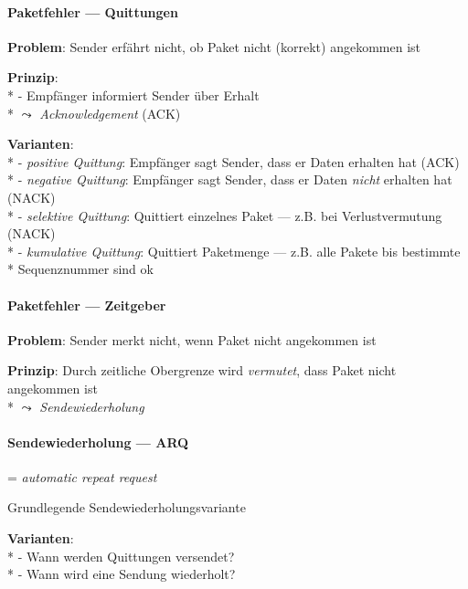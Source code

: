 \paragraph{Paketfehler --- Quittungen}
\begin{items}
  \item \textbf{Problem}: Sender erfährt nicht, ob Paket nicht (korrekt) angekommen ist
  \item \textbf{Prinzip}: \\*
    - Empfänger informiert Sender über Erhalt \\*
      \phantom{-} \( \leadsto \) \emph{Acknowledgement} (ACK)
  \item \textbf{Varianten}: \\*
    - \emph{positive Quittung}: Empfänger sagt Sender, dass er Daten erhalten hat (ACK) \\*
    - \emph{negative Quittung}: Empfänger sagt Sender, dass er Daten \emph{nicht} erhalten hat (NACK) \\*
    - \emph{selektive Quittung}: Quittiert einzelnes Paket --- z.B. bei Verlustvermutung (NACK) \\*
    - \emph{kumulative Quittung}: Quittiert Paketmenge --- z.B. alle Pakete bis bestimmte \\* \phantom{-} \phantom{-} Sequenznummer sind ok
\end{items}

\paragraph{Paketfehler --- Zeitgeber}
\begin{items}
  \item \textbf{Problem}: Sender merkt nicht, wenn Paket nicht angekommen ist
  \item \textbf{Prinzip}: Durch zeitliche Obergrenze wird \emph{vermutet}, dass Paket nicht angekommen ist \\* \( \leadsto \) \emph{Sendewiederholung}
\end{items}

\paragraph{Sendewiederholung --- ARQ}
\begin{items}
  \item = \emph{automatic repeat request}
  \item Grundlegende Sendewiederholungsvariante
  \item \textbf{Varianten}: \\*
    - Wann werden Quittungen versendet? \\*
    - Wann wird eine Sendung wiederholt?
\end{items}

